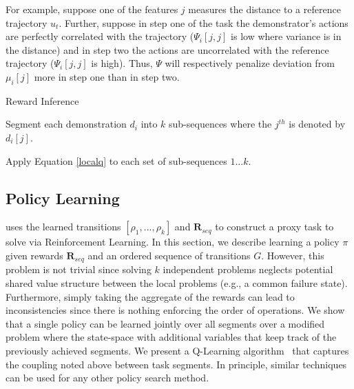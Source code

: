 For example, suppose one of the features $j$ measures the distance to a reference trajectory $u_t$. 
Further, suppose in step one of the task the demonstrator's actions are perfectly correlated with the trajectory ($\Psi_{i}[j,j]$ is low where variance is in the distance) and in step two the actions are uncorrelated with the reference trajectory ($\Psi_{i}[j,j]$ is high).
Thus, $\Psi$ will respectively penalize deviation from $\mu_{i}[j]$ more in step one than in step two.


\begin{algorithm}[t]
\small
\caption{Reward Inference \label{alg:tsh2}}

Segment each demonstration $d_i$ into $k$ sub-sequences where the $j^{th}$ is denoted by $d_i[j]$.

Apply Equation \ref{localq} to each set of sub-sequences $1...k$.

\end{algorithm}



\subsection{Policy Learning}
 \hirl uses the learned transitions $[\rho_1,...,\rho_k]$ and $\mathbf{R}_{seq}$ to construct a proxy task to solve via Reinforcement Learning. In this section, we describe learning a policy $\pi$ given rewards $\mathbf{R}_{seq}$ and an ordered sequence of transitions $G$.
However, this problem is not trivial since solving $k$ independent problems neglects potential shared value structure between the local problems (e.g., a common failure state).
Furthermore, simply taking the aggregate of the rewards can lead to inconsistencies since there is nothing enforcing the order of operations.
We show that a single policy can be learned jointly over all segments over a modified problem where the state-space with additional variables that keep track of the previously achieved segments.
We present a Q-Learning algorithm~\cite{mnih2015human,sutton1998reinforcement} that captures the coupling noted above between task segments.
In principle, similar techniques can be used for any other policy search method.

